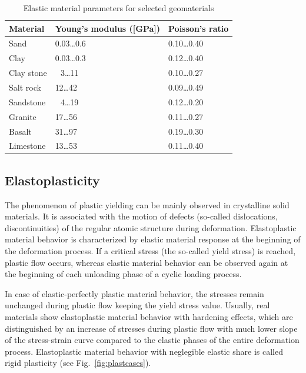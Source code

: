 \renewcommand{\arraystretch}{1.25}
\begin{table}[htb!]
\caption{Elastic material parameters for selected geomaterials}
\label{tab:rockelastpar}
\begin{center}
\begin{tabular}{|p{}||p{}|p{}|}
\hline
Material & Young's modulus ([GPa]) & Poisson's ratio \\
\hline\hline
Sand       & 0.03\dots 0.6 & 0.10\dots 0.40 \\
\hline
Clay       & 0.03\dots 0.3 & 0.12\dots 0.40\\
\hline\hline
Clay stone & \ \,3\dots 11   & 0.10\dots 0.27 \\
\hline
Salt rock  & 12\dots 42  & 0.09\dots 0.49 \\
\hline
Sandstone  & \ \,4\dots 19   & 0.12\dots 0.20 \\
\hline
Granite    & 17\dots 56  & 0.11\dots 0.27 \\
\hline
Basalt     & 31\dots 97  & 0.19\dots 0.30 \\
\hline
Limestone  & 13\dots 53  & 0.11\dots 0.40 \\
\hline
\end{tabular}
\end{center}
\end{table}
\renewcommand{\arraystretch}{1.00}

\subsection{Elastoplasticity}
\label{sec:elastoplast}

The phenomenon of plastic yielding can be mainly observed in crystalline solid materials. It is associated with the motion of defects
(so-called dislocations, discontinuities) of the regular atomic structure during deformation. Elastoplastic material behavior is
characterized by elastic material response at the beginning of the deformation process. If a critical stress (the so-called yield stress)
is reached, plastic flow occurs, whereas elastic material behavior can be observed again at the beginning of each unloading phase of a
cyclic loading process.

In case of elastic-perfectly plastic material behavior, the stresses remain unchanged during plastic flow keeping the yield stress value.
Usually, real materials show elastoplastic material behavior with hardening effects, which are distinguished by an increase of stresses
during plastic flow with much lower slope of the stress-strain curve compared to the elastic phases of the entire deformation process.
Elastoplastic material behavior with neglegible elastic share is called rigid plasticity (see Fig.~\ref{fig:plastcases}).


